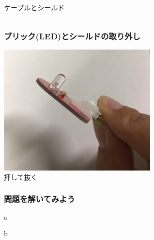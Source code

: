 \begin{frame}
\begin{columns}
\begin{column}{0.48\textwidth}
            {ケーブルとシールド}
        \end{column}
    \end{columns}
\end{frame}

\begin{frame}
    \frametitle{ブリック(LED)とシールドの取り外し}
    \begin{center}
        \includegraphics[width=0.6\textwidth]{images/chap05/text05-img011.jpg}
        {\\押して抜く}
    \end{center}
\end{frame}

\begin{frame}[fragile]
    \frametitle{問題を解いてみよう}
    \begin{description}
        \item a
        \item b
    \end{description}
\end{frame}
